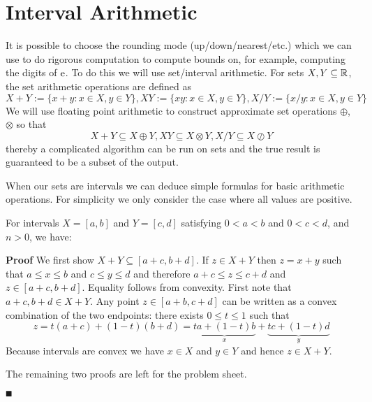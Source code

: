 
\section{Interval Arithmetic}
It is possible to choose the rounding mode (up/down/nearest/etc.) which we can use to do rigorous computation to compute bounds on, for example, computing the digits of ${\rm e}$. To do this we will use set/interval arithmetic. For sets $X,Y \subseteq {\mathbb R}$, the set arithmetic operations are defined as
\[
X + Y := \{x + y : x \ensuremath{\in} X, y \ensuremath{\in} Y\}, XY := \{xy : x \ensuremath{\in} X, y \ensuremath{\in} Y\}, X/Y := \{x/y : x \ensuremath{\in} X, y \ensuremath{\in} Y\}
\]
We will use floating point arithmetic to construct approximate set operations \ensuremath{\oplus}, \ensuremath{\otimes} so that
\[
  X + Y \ensuremath{\subseteq} X \ensuremath{\oplus} Y, XY \ensuremath{\subseteq} X \ensuremath{\otimes} Y, X/Y \ensuremath{\subseteq} X \ensuremath{\oslash} Y
\]
thereby a complicated algorithm can be run on sets and the true result is guaranteed to be a subset of the output.

When our sets are intervals we can deduce simple formulas for basic arithmetic operations. For simplicity we only consider the case where all values are positive.

\begin{proposition} For intervals  $X = [a,b]$ and $Y = [c,d]$ satisfying $0 < a < b$ and $0 < c < d$, and $n > 0$, we have:
\end{proposition}
\textbf{Proof} We first show $X+Y \ensuremath{\subseteq} [a+c,b+d]$. If $z \ensuremath{\in} X + Y$ then $z = x+y$ such that $a \ensuremath{\leq} x \ensuremath{\leq} b$ and $c \ensuremath{\leq} y \ensuremath{\leq} d$ and therefore $a + c \ensuremath{\leq} z \ensuremath{\leq} c + d$ and $z \ensuremath{\in} [a+c,b+d]$. Equality follows from convexity. First note that $a+c, b+d \ensuremath{\in} X+Y$. Any point $z \ensuremath{\in}  [a+b,c+d]$ can be written  as a convex combination of the two endpoints: there exists $0 \ensuremath{\leq} t \ensuremath{\leq} 1$ such that
\[
z = t (a+c) + (1-t) (b+d) =  \underbrace{t a + (1-t) b}_x + \underbrace{t c + (1-t) d}_y
\]
Because intervals are convex we have $x \ensuremath{\in} X$ and $y \ensuremath{\in} Y$ and hence $z \ensuremath{\in} X+Y$. 

The remaining two proofs are left for the problem sheet. 

\ensuremath{\QED}

